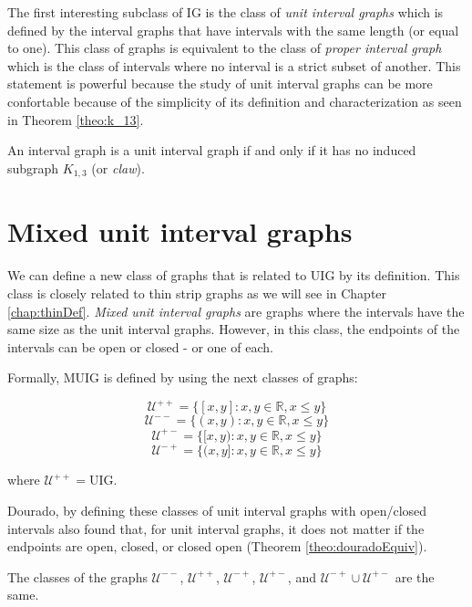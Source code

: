 The first interesting subclass of IG is the class of \emph{unit interval graphs} which is defined by the interval graphs that have intervals with the same length (or equal to one). This class of graphs is equivalent to the class of \emph{proper interval graph} which is the class of intervals where no interval is a strict subset of another. This statement is powerful because the study of unit interval graphs can be more confortable because of the simplicity of its definition and characterization as seen in Theorem \ref{theo:k_13}.

\begin{theorem}
  \label{theo:k_13}
  An interval graph is a unit interval graph if and only if it has no induced subgraph $K_{1,3}$ (or \emph{claw}).
\end{theorem}

\section{Mixed unit interval graphs}
\label{sec:muig}

We can define a new class of graphs that is related to UIG by its definition. This class is closely related to thin strip graphs as we will see in Chapter \ref{chap:thinDef}. \emph{Mixed unit interval graphs} are graphs where the intervals have the same size as the unit interval graphs. However, in this class, the endpoints of the intervals can be open or closed - or one of each.

Formally, MUIG is defined by using the next classes of graphs:

$$\mathcal{U}^{++} = \{[x,y] : x,y \in \mathbb{R}, x\leq y\}$$
$$\mathcal{U}^{--} = \{(x,y) : x,y \in \mathbb{R}, x\leq y\}$$
$$\mathcal{U}^{+-} = \{[x,y) : x,y \in \mathbb{R}, x\leq y\}$$
$$\mathcal{U}^{-+} = \{(x,y] : x,y \in \mathbb{R}, x\leq y\}$$

where $\mathcal{U}^{++} = \text{UIG}$.

Dourado, by defining these classes of unit interval graphs with open/closed intervals also found that, for unit interval graphs, it does not matter if the endpoints are open, closed, or closed open (Theorem \ref{theo:douradoEquiv}).

\begin{theorem}
  \label{theo:douradoEquiv}
  The classes of the graphs $\mathcal{U}^{--}$, $\mathcal{U}^{++}$,
  $\mathcal{U}^{-+}$, $\mathcal{U}^{+-}$, and  $\mathcal{U}^{-+} \cup
  \mathcal{U}^{+-}$ are the same.
\end{theorem}

